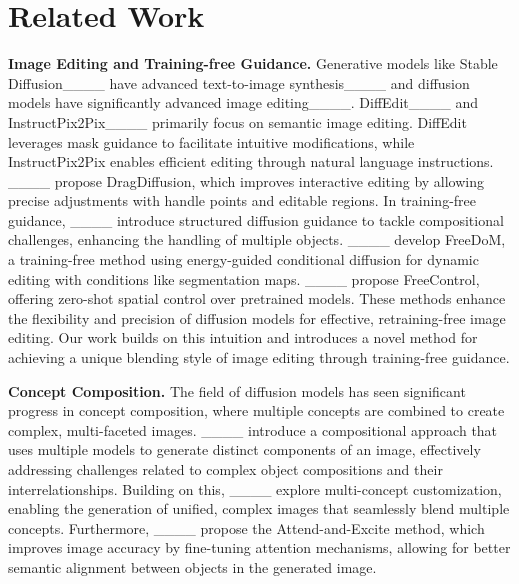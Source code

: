 \section{Related Work}
\textbf{Image Editing and Training-free Guidance. }Generative models like Stable Diffusion____ have advanced text-to-image synthesis____ and diffusion models have significantly advanced image editing____. DiffEdit____ and InstructPix2Pix____ primarily focus on semantic image editing. DiffEdit leverages mask guidance to facilitate intuitive modifications, while InstructPix2Pix enables efficient editing through natural language instructions. ____ propose DragDiffusion, which improves interactive editing by allowing precise adjustments with handle points and editable regions. In training-free guidance, ____ introduce structured diffusion guidance to tackle compositional challenges, enhancing the handling of multiple objects. ____ develop FreeDoM, a training-free method using energy-guided conditional diffusion for dynamic editing with conditions like segmentation maps. ____ propose FreeControl, offering zero-shot spatial control over pretrained models. These methods enhance the flexibility and precision of diffusion models for effective, retraining-free image editing. Our work builds on this intuition and introduces a novel method for achieving a unique blending style of image editing through training-free guidance.

\textbf{Concept Composition. }The field of diffusion models has seen significant progress in concept composition, where multiple concepts are combined to create complex, multi-faceted images. ____ introduce a compositional approach that uses multiple models to generate distinct components of an image, effectively addressing challenges related to complex object compositions and their interrelationships. Building on this, ____ explore multi-concept customization, enabling the generation of unified, complex images that seamlessly blend multiple concepts. Furthermore, ____ propose the Attend-and-Excite method, which improves image accuracy by fine-tuning attention mechanisms, allowing for better semantic alignment between objects in the generated image. 

